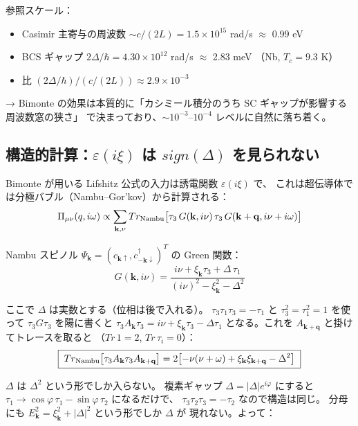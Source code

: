 \documentclass[11pt,a4paper]{article}
\def\mathrm#1{#1}%
\def\textbf#1{#1}%
\begin{document}
参照スケール：
\begin{itemize}
\item Casimir 主寄与の周波数 $\sim c/(2L) = 1.5\times 10^{15}$ rad/s $\approx$ 0.99 eV
\item BCS ギャップ $2\Delta/\hbar = 4.30\times 10^{12}$ rad/s $\approx$ 2.83 meV
  （Nb, $T_c=9.3$ K）
\item 比 $(2\Delta/\hbar) / (c/(2L)) \approx 2.9\times 10^{-3}$
\end{itemize}

→ Bimonte の効果は本質的に「カシミール積分のうち SC ギャップが影響する周波数窓の狭さ」
で決まっており、$\sim 10^{-3}$--$10^{-4}$ レベルに自然に落ち着く。

\subsection{構造的計算：$\varepsilon(i\xi)$ は $\mathrm{sign}(\Delta)$ を見られない}

Bimonte が用いる Lifshitz 公式の入力は誘電関数 $\varepsilon(i\xi)$ で、
これは超伝導体では分極バブル（Nambu--Gor'kov）から計算される：
\[
  \Pi_{\mu\nu}(q,i\omega) \propto \sum_{\mathbf{k},\nu}
  \mathrm{Tr}_{\rm Nambu}\bigl[\tau_3\,G(\mathbf{k},i\nu)\,\tau_3\,
  G(\mathbf{k}+\mathbf{q},i\nu+i\omega)\bigr]
\]

Nambu スピノル $\Psi_\mathbf{k} = (c_{\mathbf{k}\uparrow},c_{-\mathbf{k}\downarrow}^\dagger)^T$
の Green 関数：
\[
  G(\mathbf{k},i\nu) = \frac{i\nu + \xi_\mathbf{k}\tau_3 + \Delta\,\tau_1}
  {(i\nu)^2 - \xi_\mathbf{k}^2 - \Delta^2}
\]

ここで $\Delta$ は実数とする（位相は後で入れる）。
$\tau_3 \tau_1 \tau_3 = -\tau_1$ と $\tau_3^2 = \tau_1^2 = 1$ を使って
$\tau_3 G \tau_3$ を陽に書くと
$\tau_3 A_\mathbf{k}\tau_3 = i\nu + \xi_\mathbf{k}\tau_3 - \Delta\tau_1$
となる。これを $A_{\mathbf{k}+\mathbf{q}}$ と掛けてトレースを取ると
（$\mathrm{Tr}\,1 = 2$, $\mathrm{Tr}\,\tau_i = 0$）：
\[
  \boxed{\;\mathrm{Tr}_{\rm Nambu}\bigl[\tau_3 A_\mathbf{k}\tau_3 A_{\mathbf{k}+\mathbf{q}}\bigr]
  = 2\bigl[-\nu(\nu+\omega) + \xi_\mathbf{k}\xi_{\mathbf{k}+\mathbf{q}} - \Delta^2\bigr]\;}
\]

\textbf{$\Delta$ は $\Delta^2$ という形でしか入らない。}
複素ギャップ $\Delta = |\Delta|e^{i\varphi}$ にすると
$\tau_1 \to \cos\varphi\,\tau_1 - \sin\varphi\,\tau_2$ になるだけで、
$\tau_3 \tau_2 \tau_3 = -\tau_2$ なので構造は同じ。
分母にも $E_\mathbf{k}^2 = \xi_\mathbf{k}^2 + |\Delta|^2$ という形でしか $\Delta$ が
現れない。よって：
\end{document}
